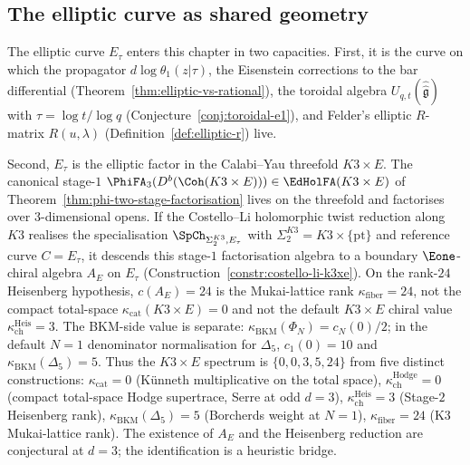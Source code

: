 
\subsection{The elliptic curve as shared geometry}
\label{subsec:bridge-shared-E}

\begin{remark}
\label{rem:bridge-shared-E}
The elliptic curve $E_\tau$ enters this chapter in two capacities. First,
it is the curve on which the propagator $d\log\theta_1(z|\tau)$, the
Eisenstein corrections to the bar differential
(Theorem~\ref{thm:elliptic-vs-rational}), the toroidal algebra
$U_{q,t}(\hat{\hat{\mathfrak{g}}})$ with
$\tau = \log t / \log q$ (Conjecture~\ref{conj:toroidal-e1}), and
Felder's elliptic $R$-matrix $R(u,\lambda)$
(Definition~\ref{def:elliptic-r}) live.

Second, $E_\tau$ is the elliptic factor in the Calabi--Yau threefold
$K3 \times E$. The canonical stage-$1$
$\PhiFA_3(D^b(\Coh(K3 \times E))) \in \EdHolFA(K3 \times E)$ of
Theorem~\ref{thm:phi-two-stage-factorisation} lives on the threefold
and factorises over $3$-dimensional opens. If the Costello--Li
holomorphic twist reduction along $K3$ realises the specialisation
$\SpCh_{\Sigma_2^{K3}, E_\tau}$ with
$\Sigma_2^{K3} = K3 \times \{\mathrm{pt}\}$ and reference curve
$C = E_\tau$, it descends this stage-$1$ factorisation algebra to a
boundary $\Eone$-chiral algebra $A_E$ on $E_\tau$ (Construction~\ref{constr:costello-li-k3xe}).
On the rank-$24$ Heisenberg hypothesis, $c(A_E)=24$ is the Mukai-lattice
rank $\kappa_{\mathrm{fiber}}=24$, not the compact total-space
$\kappa_{\mathrm{cat}}(K3\times E)=0$ and not the default
$K3\times E$ chiral value $\kappa_{\mathrm{ch}}^{\mathrm{Heis}}=3$.
The BKM-side value is separate:
$\kappa_{\mathrm{BKM}}(\Phi_N)=c_N(0)/2$; in the default $N=1$ denominator
normalisation for $\Delta_5$, $c_1(0)=10$ and
$\kappa_{\mathrm{BKM}}(\Delta_5)=5$. Thus the
$K3\times E$ spectrum is $\{0, 0, 3, 5, 24\}$ from five distinct
constructions: $\kappa_{\mathrm{cat}} = 0$ (Künneth multiplicative
on the total space), $\kappa_{\mathrm{ch}}^{\mathrm{Hodge}} = 0$
(compact total-space Hodge supertrace, Serre at odd $d = 3$),
$\kappa_{\mathrm{ch}}^{\mathrm{Heis}} = 3$ (Stage-$2$ Heisenberg
rank), $\kappa_{\mathrm{BKM}}(\Delta_5) = 5$ (Borcherds weight at
$N = 1$), $\kappa_{\mathrm{fiber}} = 24$ (K3 Mukai-lattice rank). The existence of $A_E$ and the Heisenberg reduction are
conjectural at $d=3$; the identification is a heuristic bridge.


\end{remark}
